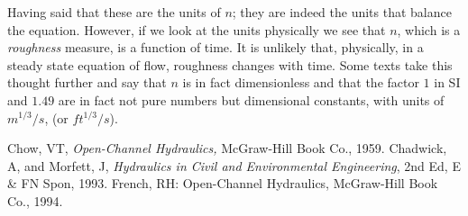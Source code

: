 \documentclass[a4paper, 12pt, british]{article} %
\numberwithin{equation}{section}
\numberwithin{figure}{section}
\numberwithin{table}{section}
\begin{document}
	Having said that these are the units of $n$; they are indeed the units that balance the equation. However, if we look at the units physically we see that $n$, which is a \textit{roughness} measure, is a function of time. It is unlikely that, physically, in a steady state equation of flow, roughness changes with time. Some texts take this thought further and say that $n$ is in fact dimensionless and that the factor $1$ in SI and $1.49$ are in fact not pure numbers but dimensional constants, with units of  $m^{1/3} /s$, (or $ft^{1/3} /s$).


\begin{thebibliography}{99}
 Chow, VT, \emph{Open-Channel Hydraulics,} McGraw-Hill Book Co., 1959.
 Chadwick, A, and Morfett, J, \emph{Hydraulics in Civil and Environmental Engineering}, 2nd Ed, E \& FN Spon, 1993.
	French, RH: Open-Channel Hydraulics, McGraw-Hill Book Co., 1994.
\end{thebibliography}
\end{document}
